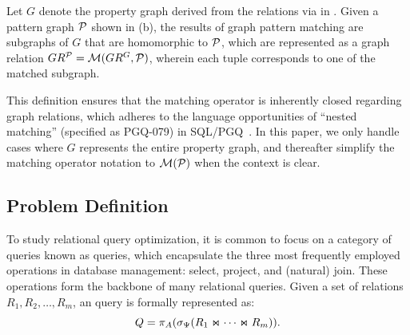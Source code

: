 \begin{example}
    \label{ex:matching}
    Let \(G\) denote the property graph derived from the relations via \rgmapping in .
    Given a pattern graph \(\mathcal{P}\) shown in (b), the results of graph pattern matching are subgraphs of \(G\) that are homomorphic to \(\mathcal{P}\), which are represented as a graph relation \(GR^{\mathcal{P}} = \mathcal{M}(GR^{G}, \mathcal{P})\), wherein each tuple corresponds to one of the matched subgraph.
\end{example}

This definition ensures that the matching operator is inherently closed regarding graph relations,
which adheres to the language opportunities of ``nested matching'' (specified as PGQ-079) in SQL/PGQ~\cite{sql-pgq}.
In this paper, we only handle cases where $G$ represents the entire property graph, and thereafter simplify the matching operator notation to $\mathcal{M}(\mathcal{P})$ when the context is clear.


\subsection{Problem Definition}
\label{sec:problem-definition}

To study relational query optimization, it is common to focus on a category of queries known as \spj queries,
which encapsulate the three most frequently employed operations in database management: select, project, and (natural) join.
These operations form the backbone of many relational queries. Given a set of relations \(R_1, R_2, \ldots, R_m\),
an \spj query is formally represented as:
\[
Q = \pi_A(\sigma_\Psi(R_1 \Join \cdots \Join R_m)).
\]

